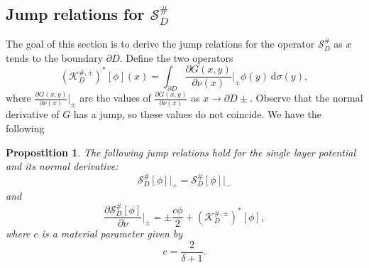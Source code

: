 \documentclass[a4paper]{article}
\newtheorem{prop}{Propostition}
\theoremstyle{definition}
\renewcommand{\S}{\mathcal{S}}
\newcommand{\K}{\mathcal{K}}
\newcommand{\dx}{\: \mathrm{d}}
\begin{document}
\subsection{Jump relations for $\S_D^\#$}
The goal of this section is to derive the jump relations for the operator $\S_D^\#$ as $x$ tends to the boundary $\partial D$. Define the two operators 
\[(\K_D^{\#,\pm})^*[\phi](x) = \int_{\partial D}\frac{\partial G(x,y)}{\partial \nu(x)}\bigg|_{\pm} \phi(y)\dx \sigma(y),\]
where $\frac{\partial G(x,y)}{\partial \nu(x)}\big|_{\pm}$ are the values of $\frac{\partial G(x,y)}{\partial \nu(x)}$ as $x\rightarrow \partial D \pm$. Observe that the normal derivative of $G$ has a jump, so these values do not coincide. We have the following
\begin{prop} \label{prop:jump}
	The following jump relations hold for the single layer potential and its normal derivative:
\[\S_D^\#[\phi]\big|_+ = \S_D^\#[\phi]\big|_-\]
and
\[\frac{\partial \S_D^\#[\phi]}{\partial \nu} \bigg|_{\pm} = \pm \frac{c\phi}{2} + (\K_D^{\#,\pm})^* [\phi],\]
where $c$ is a material parameter given by
\[c = \frac{2}{\delta+1}.\]
\end{prop}
\end{document}
